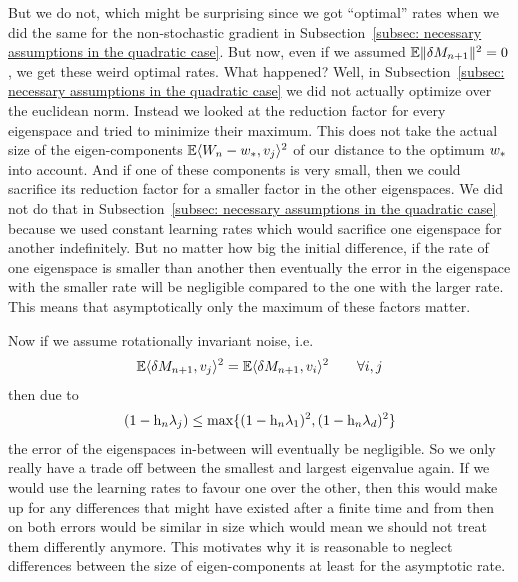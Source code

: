 But we do not, which might be surprising since we got ``optimal'' rates when
we did the same for the non-stochastic gradient in Subsection~\ref{subsec:
necessary assumptions in the quadratic case}. But now, even if we assumed
\(\mathbb{E}\|\delta M_{n+1}\|^2=0\), we get these weird optimal rates. What happened?
Well, in Subsection~\ref{subsec: necessary assumptions in the quadratic case}
we did not actually optimize over the euclidean norm. Instead we looked at the
reduction factor for every eigenspace and tried to minimize their maximum.
This does not take the actual size of the eigen-components
\(\mathbb{E}\langle W_n-w_*, v_j\rangle^2\) of our distance to the optimum
\(w_*\) into account. And if one of these components is very small, then
we could sacrifice its reduction factor for a smaller factor in the other
eigenspaces. We did not do that in Subsection~\ref{subsec: necessary assumptions
in the quadratic case} because we used constant learning rates which would
sacrifice one eigenspace for another indefinitely. But no matter how big the
initial difference, if the rate of one eigenspace is smaller than another then
eventually the error in the eigenspace with the smaller rate will be
negligible compared to the one with the larger rate. This means that
asymptotically only the maximum of these factors matter.

Now if we assume rotationally invariant noise, i.e.
\begin{align*}
	\mathbb{E}\langle\delta M_{n+1},v_j\rangle^2 = \mathbb{E}\langle\delta M_{n+1}, v_i\rangle^2
	\qquad \forall i,j
\end{align*}
then due to
\begin{align*}
	(1-\text{h}_n \lambda_j)
	\le \max \{ (1-\text{h}_n\lambda_1)^2, (1-\text{h}_n\lambda_d)^2 \}
\end{align*}
the error of the eigenspaces in-between will eventually be negligible. So we 
only really have a trade off between the smallest and largest eigenvalue again.
If we would use the learning rates to favour one over the other, then this would
make up for any differences that might have existed after a finite time and
from then on both errors would be similar in size which would mean we should
not treat them differently anymore. This motivates why it is reasonable to
neglect differences between the size of eigen-components at least for the
asymptotic rate.

